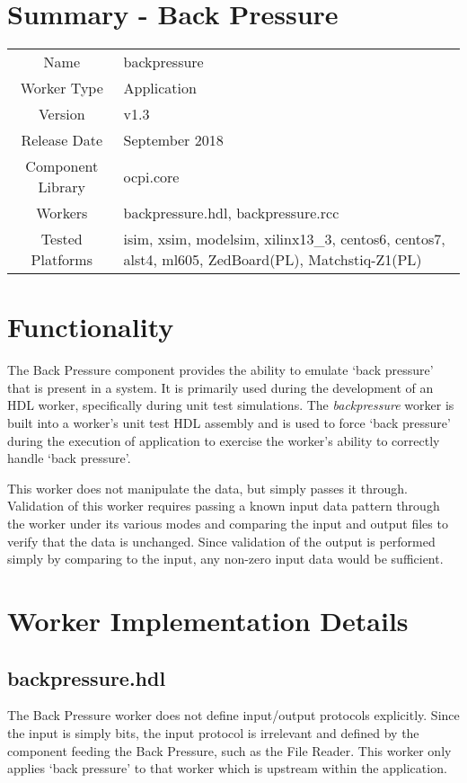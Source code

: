 \documentclass{article}
\author{} %
\date{Version \docVersion} %
\title{\docTitle}
\def\docVersion{1.3}
\def\comp{backpressure}
\def\Comp{Back Pressure}
\begin{document}
\section*{Summary - \Comp}
\begin{tabular}{|c|M{13.5cm}|}
	\hline
	                  &  \\
	\hline
	Name              & \comp  \\
	\hline
	Worker Type       & Application  \\
	\hline
	Version           & v\docVersion  \\
	\hline
	Release Date      & September 2018  \\
	\hline
	Component Library & ocpi.core  \\
	\hline
	Workers           & \comp.hdl, \comp.rcc  \\
	\hline
	Tested Platforms  & isim, xsim, modelsim, xilinx13\_3, centos6, centos7, alst4, ml605, ZedBoard(PL), Matchstiq-Z1(PL)  \\
	\hline
\end{tabular}

\section*{Functionality}
\begin{flushleft}
	The Back Pressure component provides the ability to emulate `back pressure'
that is present in a system. It is primarily used during the development of an HDL worker,
specifically during unit test simulations. The \textit{backpressure} worker is built
into a worker's unit test HDL assembly and is used to force `back pressure'
during the execution of application to exercise the worker's ability to correctly handle
`back pressure'.\medskip

	This worker does not manipulate the data, but simply passes it through.
Validation of this worker requires passing a known input data pattern
through the worker under its various modes and comparing the input and
output files to verify that the data is unchanged. Since validation of the
output is performed simply by comparing to the input, any non-zero input
data would be sufficient.\medskip
\end{flushleft}

\section*{Worker Implementation Details}
\subsection*{\comp.hdl}
\begin{flushleft}
	The Back Pressure worker does not define input/output protocols explicitly. Since the input is simply bits, the input protocol is irrelevant and defined by the component feeding the Back Pressure, such as the File Reader. This worker only applies `back pressure' to that worker which is upstream within the application.\medskip
\end{flushleft}
\end{document}
